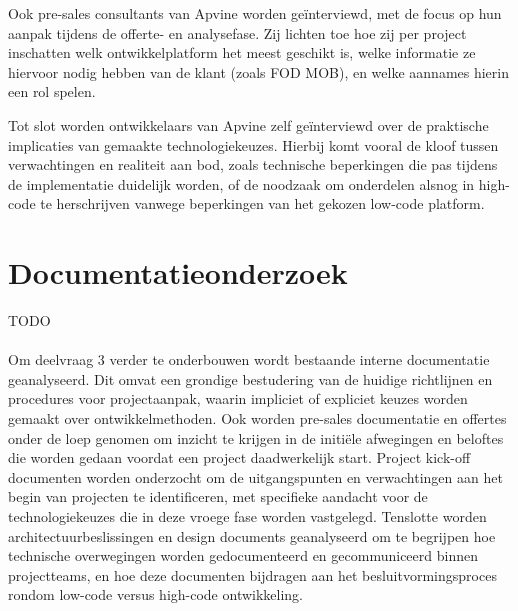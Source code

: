 Ook pre-sales consultants van Apvine worden geïnterviewd, met de focus op hun aanpak tijdens de offerte- en analysefase. Zij lichten toe hoe zij per project inschatten welk ontwikkelplatform het meest geschikt is, welke informatie ze hiervoor nodig hebben van de klant (zoals \gls{FOD MOB}), en welke aannames hierin een rol spelen.

Tot slot worden ontwikkelaars van Apvine zelf geïnterviewd over de praktische implicaties van gemaakte technologiekeuzes. Hierbij komt vooral de kloof tussen verwachtingen en realiteit aan bod, zoals technische beperkingen die pas tijdens de implementatie duidelijk worden, of de noodzaak om onderdelen alsnog in high-code te herschrijven vanwege beperkingen van het gekozen low-code platform.


\section{Documentatieonderzoek}
TODO
\\
\\
Om deelvraag 3 verder te onderbouwen wordt bestaande interne documentatie geanalyseerd. Dit omvat een grondige bestudering van de huidige richtlijnen en procedures voor projectaanpak, waarin impliciet of expliciet keuzes worden gemaakt over ontwikkelmethoden. Ook worden pre-sales documentatie en offertes onder de loep genomen om inzicht te krijgen in de initiële afwegingen en beloftes die worden gedaan voordat een project daadwerkelijk start. Project kick-off documenten worden onderzocht om de uitgangspunten en verwachtingen aan het begin van projecten te identificeren, met specifieke aandacht voor de technologiekeuzes die in deze vroege fase worden vastgelegd. Tenslotte worden architectuurbeslissingen en design documents geanalyseerd om te begrijpen hoe technische overwegingen worden gedocumenteerd en gecommuniceerd binnen projectteams, en hoe deze documenten bijdragen aan het besluitvormingsproces rondom low-code versus high-code ontwikkeling.
